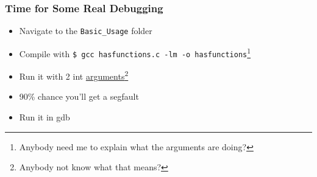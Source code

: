 \documentclass[aspectratio=169]{beamer}
\newcommand{\code}{\texttt}
\begin{document}
\begin{frame}
    \frametitle{Time for Some Real Debugging}

    \begin{itemize}
        \item Navigate to the \code{Basic\_Usage} folder
        \item Compile with \code{\$~gcc~hasfunctions.c~-lm~-o~hasfunctions}\footnote[frame]{Anybody need me to explain what the arguments are doing?}
        \item Run it with 2 int \underline{arguments}\footnote[frame]{Anybody not know what that means?}
        \pause
        \item 90\% chance you'll get a segfault
        \item Run it in gdb
    \end{itemize}

\end{frame}
\end{document}
